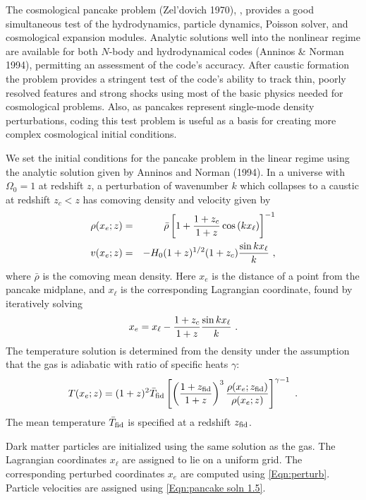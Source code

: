 The cosmological pancake problem (Zel'dovich 1970),
, provides a good
simultaneous
test of the hydrodynamics, particle dynamics, Poisson solver, and
cosmological expansion modules. Analytic
solutions well into the nonlinear regime are available for both
$N$-body and hydrodynamical codes
(Anninos \& Norman 1994), permitting an assessment of the code's accuracy.
After caustic formation the problem provides a stringent test of the code's
ability to track thin, poorly resolved features and strong shocks using
most of the basic physics needed for cosmological problems. Also, as pancakes
represent single-mode density perturbations, coding this test problem is
useful as a basis for creating more complex cosmological initial conditions.

We set the initial conditions for the pancake problem in the
linear regime using the
analytic solution given by Anninos and Norman (1994). In a universe with
$\Omega_0=1$ at redshift $z$, a perturbation
of wavenumber $k$ which collapses to a caustic at redshift $z_c<z$ has
comoving density and velocity given by
\begin{eqnarray}
\label{Eqn:pancake soln 1}
\rho(x_e;z) & = & \bar{\rho}\left[1 + {1+z_c\over1+z}\cos\left(kx_\ell\right)
    \right]^{-1}\\
\label{Eqn:pancake soln 1.5}
v(x_e;z)    & = & -H_0(1+z)^{1/2}(1+z_c){\sin kx_\ell\over k}\ ,
\end{eqnarray}
\noindent where $\bar{\rho}$ is the comoving mean density.
Here $x_e$ is the distance of a point from the pancake midplane,
and $x_\ell$ is the corresponding Lagrangian coordinate, found by iteratively
solving
\begin{equation}
\label{Eqn:perturb}
x_e = x_\ell - {1+z_c\over 1+z}{\sin kx_\ell\over k}\ .
\end{equation}
\noindent The temperature solution is determined from the density under
the assumption that the gas is adiabatic with ratio of specific heats
$\gamma$:
\begin{equation}
\label{Eqn:pancake soln 2}
T(x_e;z) = (1+z)^2\bar{T}_{\rm fid}\left[\left({1+z_{\rm fid}\over 1+z}
    \right)^3
    {\rho(x_e;z_{\rm fid})\over\rho(x_e;z)}\right]^{\gamma-1}\ .
\end{equation}
\noindent The mean temperature $\bar{T}_{\rm fid}$ is specified at a
redshift $z_{\rm fid}$.

Dark matter particles are initialized using the same solution as the
gas. The Lagrangian coordinates $x_\ell$ are assigned to lie on a
uniform grid. The corresponding perturbed coordinates $x_e$ are
computed using \eqref{Eqn:perturb}. Particle velocities are
assigned using \eqref{Eqn:pancake soln 1.5}.


